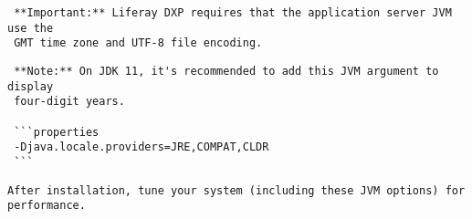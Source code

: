 \begin{verbatim}
 **Important:** Liferay DXP requires that the application server JVM use the
 GMT time zone and UTF-8 file encoding.
\end{verbatim}

\noindent\hrulefill

\noindent\hrulefill

\begin{verbatim}
 **Note:** On JDK 11, it's recommended to add this JVM argument to display
 four-digit years.

 ```properties
 -Djava.locale.providers=JRE,COMPAT,CLDR
 ```
\end{verbatim}

\noindent\hrulefill

\begin{verbatim}
After installation, tune your system (including these JVM options) for
performance.
\end{verbatim}

